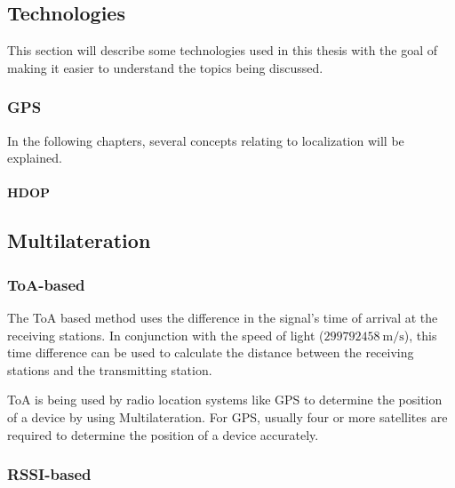 \subsection{Technologies}

This section will describe some technologies used in this thesis with the goal of making it easier to understand the topics being discussed.

\subsubsection{\ac{GPS}}


In the following chapters, several concepts relating to localization will be explained.

\paragraph{\ac{HDOP}}


\subsection{Multilateration}


\subsubsection{\acs{ToA}-based}

The \acf{ToA} based method uses the difference in the signal's time of arrival at the receiving stations.
In conjunction with the speed of light ($299792458\ \mathrm{m/s}$), this time difference can be used to calculate the distance between the receiving stations and the transmitting station.

\ac{ToA} is being used by radio location systems like \ac{GPS} to determine the position of a device by using Multilateration.
For GPS, usually four or more satellites are required to determine the position of a device accurately.


\subsubsection{\acs{RSSI}-based}

